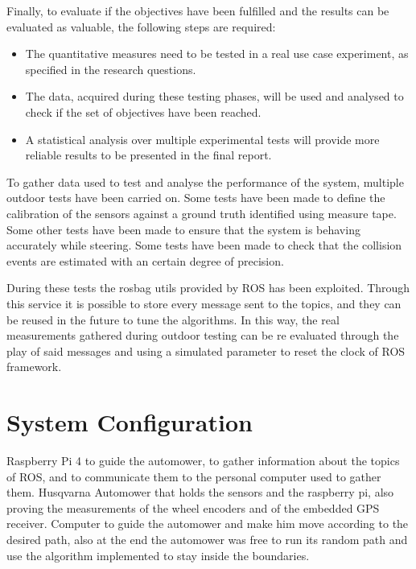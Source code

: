 Finally, to evaluate if the objectives have been fulfilled and the results can be evaluated as valuable, the following steps are required:
\begin{itemize}
    \item The quantitative measures need to be tested in a real use case experiment, as specified in the research questions.
    \item The data, acquired during these testing phases, will be used and analysed to check if the set of objectives have been reached.
    \item A statistical analysis over multiple experimental tests will provide more reliable results to be presented in the final report.
\end{itemize}



To gather data used to test and analyse the performance of the system, multiple outdoor tests have been carried on.
Some tests have been made to define the calibration of the sensors against a ground truth identified using measure tape. 
Some other tests have been made to ensure that the system is behaving accurately while steering.
Some tests have been made to check that the collision events are estimated with an certain degree of precision.

During these tests the rosbag utils provided by ROS has been exploited. Through this service it is possible to store every message sent to the topics, and they can be reused in the future to tune the algorithms.
In this way, the real measurements gathered during outdoor testing can be re evaluated through the play of said messages and using a simulated parameter to reset the clock of ROS framework.


\section{System Configuration}
\label{sec:system}

\noindent 
Raspberry Pi 4 to guide the automower, to gather information about the topics of ROS, and to communicate them to the personal computer used to gather them.
Husqvarna Automower that holds the sensors and the raspberry pi, also proving the measurements of the wheel encoders and of the embedded GPS receiver. 
Computer to guide the automower and make him move according to the desired path, also at the end the automower was free to run its random path and use the algorithm implemented to stay inside the boundaries.
 
